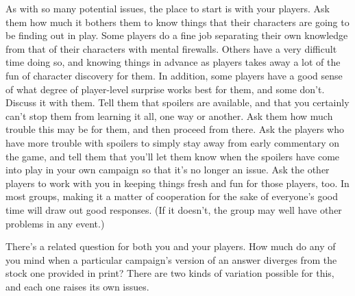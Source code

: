 As with so many potential issues, the place to start 
is with your players. Ask them how much it bothers 
them to know things that their characters are going 
to be finding out in play. Some players do a fine job 
separating their own knowledge from that of their 
characters with mental firewalls. Others have a very 
difficult time doing so, and knowing things in advance 
as players takes away a lot of the fun of character 
discovery for them. In addition, some players have 
a good sense of what degree of player-level surprise 
works best for them, and some don't. Discuss it with 
them. Tell them that spoilers are available, and that 
you certainly can't stop them from learning it all, one 
way or another. Ask them how much trouble this may 
be for them, and then proceed from there. Ask the 
players who have more trouble with spoilers to simply 
stay away from early commentary on the game, and 
tell them that you'll let them know when the spoilers 
have come into play in your own campaign so that 
it's no longer an issue. Ask the other players to work 
with you in keeping things fresh and fun for those 
players, too. In most groups, making it a matter of 
cooperation for the sake of everyone's good time will 
draw out good responses. (If it doesn't, the group may 
well have other problems in any event.) 

There's a related question for both you and your 
players. How much do any of you mind when a particular
campaign's version of an answer diverges from
the stock one provided in print? There are two kinds 
of variation possible for this, and each one raises its 
own issues. 

